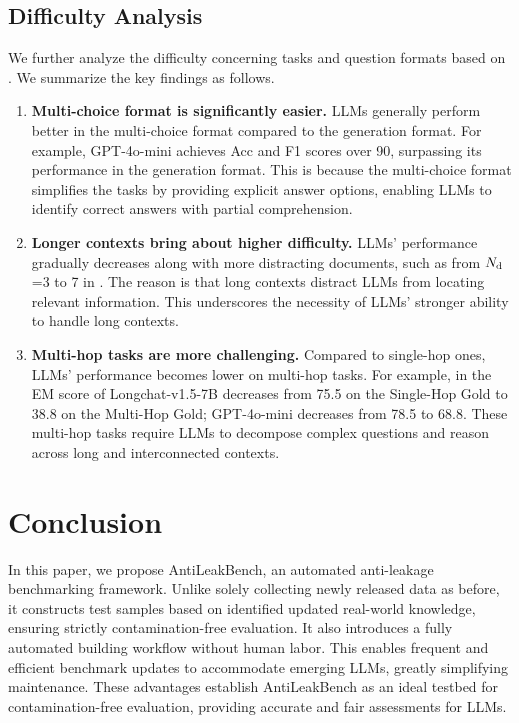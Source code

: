 \documentclass[11pt]{article}
\newcommand{\mscript}[1]{\text{\scriptsize{#1}}}
\newcommand{\benchname}{{AntiLeakBench}\xspace}
\begin{document}
    \subsection{Difficulty Analysis} \label{sec_difficulty_analysis}
        We further analyze the difficulty concerning tasks and question formats based on .
        We summarize the key findings as follows.
        \begin{enumerate}[wide, labelindent=0pt, labelsep=2pt, itemsep=1pt, topsep=1pt, label=\textbf{(\arabic*)}]
            \item
                \textbf{Multi-choice format is significantly easier.}
                LLMs generally perform better in the multi-choice format compared to the generation format.
                For example, GPT-4o-mini achieves Acc and F1 scores over 90, surpassing its performance in the generation format.
                This is because the multi-choice format simplifies the tasks by providing explicit answer options,
                enabling LLMs to identify correct answers with partial comprehension.
            \item
                \textbf{Longer contexts bring about higher difficulty.}
                LLMs' performance gradually decreases along with more distracting documents, such as from $N_{\mscript{d}}$=3 to 7 in .
                The reason is that long contexts distract LLMs from locating relevant information.
                This underscores the necessity of LLMs' stronger ability to handle long contexts.
            \item
                \textbf{Multi-hop tasks are more challenging.}
                Compared to single-hop ones, LLMs' performance becomes lower on multi-hop tasks.
                For example, in  the EM score of Longchat-v1.5-7B decreases from 75.5 on the Single-Hop Gold to 38.8 on the Multi-Hop Gold;
                GPT-4o-mini decreases from 78.5 to 68.8.
                These multi-hop tasks require LLMs to decompose complex questions and reason across long and interconnected contexts.
        \end{enumerate}


\section{Conclusion}
    In this paper, we propose \benchname, an automated anti-leakage benchmarking framework.
    Unlike solely collecting newly released data as before,
    it constructs test samples based on identified updated real-world knowledge,
    ensuring strictly contamination-free evaluation.
    It also introduces a fully automated building workflow without human labor.
    This enables frequent and efficient benchmark updates to accommodate emerging LLMs, greatly simplifying maintenance.
    These advantages establish \benchname as an ideal testbed for contamination-free evaluation,
    providing accurate and fair assessments for LLMs.
\end{document}
